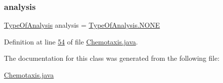 \subsubsection{\texorpdfstring{analysis}{analysis}}
{\footnotesize\ttfamily \hyperlink{enumanalysis_1_1_chemotaxis_1_1_type_of_analysis}{Type\+Of\+Analysis} analysis = \hyperlink{enumanalysis_1_1_chemotaxis_1_1_type_of_analysis_a899caa602e4fff675b17cdbab33607ec}{Type\+Of\+Analysis.\+N\+O\+NE}\hspace{0.3cm}{\ttfamily [private]}}



Definition at line \hyperlink{_chemotaxis_8java_source_l00054}{54} of file \hyperlink{_chemotaxis_8java_source}{Chemotaxis.\+java}.



The documentation for this class was generated from the following file\+:\begin{DoxyCompactItemize}
\item 
\hyperlink{_chemotaxis_8java}{Chemotaxis.\+java}\end{DoxyCompactItemize}

